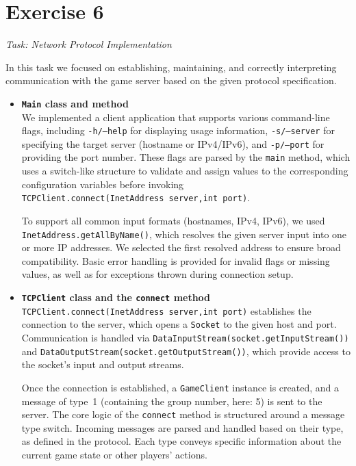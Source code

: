 \section{Exercise 6}
\textit{Task: Network Protocol Implementation}\newline

\noindent In this task we focused on establishing, maintaining, and correctly interpreting communication with the game server based on the given protocol specification.

\begin{itemize}
    \item \textbf{\texttt{Main} class and method} \\
    We implemented a client application that supports various command-line flags, including \texttt{-h/--help} for displaying usage information, \texttt{-s/--server} for specifying the target server (hostname or IPv4/IPv6), and \texttt{-p/--port} for providing the port number. These flags are parsed by the \texttt{main} method, which uses a switch-like structure to validate and assign values to the corresponding configuration variables before invoking \texttt{TCPClient.\allowbreak connect(InetAddress\allowbreak\ server,\allowbreak int\ port)}.

    To support all common input formats (hostnames, IPv4, IPv6), we used \texttt{InetAddress.getAllByName()}, which resolves the given server input into one or more IP addresses. We selected the first resolved address to ensure broad compatibility. Basic error handling is provided for invalid flags or missing values, as well as for exceptions thrown during connection setup.

    \item \textbf{\texttt{TCPClient} class and the \texttt{connect} method} \\
    \texttt{TCPClient.\allowbreak connect(InetAddress\allowbreak\ server,\allowbreak int\ port)} establishes the connection to the server, which opens a \texttt{Socket} to the given host and port. Communication is handled via \texttt{DataInputStream(socket.\allowbreak getInputStream())} and \texttt{DataOutputStream(socket.\allowbreak getOutputStream())}, which provide access to the socket's input and output streams.

    Once the connection is established, a \texttt{GameClient} instance is created, and a message of type~1 (containing the group number, here: 5) is sent to the server. The core logic of the \texttt{connect} method is structured around a message type switch. Incoming messages are parsed and handled based on their type, as defined in the protocol. Each type conveys specific information about the current game state or other players' actions.


\end{itemize}
